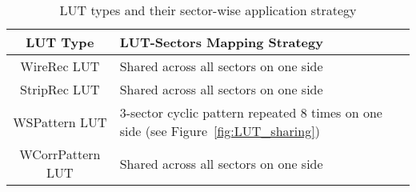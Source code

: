 \begin{table}[htbp]
  \centering
  \caption{LUT types and their sector-wise application strategy}
  \label{tab:LUT_with_sectors}
  \begin{tabular}{|c|p{8cm}|}
    \hline
    \textbf{LUT Type} & \textbf{LUT-Sectors Mapping Strategy} \\
    \hline
    WireRec LUT & Shared across all sectors on one side \\
    \hline
    StripRec LUT & Shared across all sectors on one side  \\
    \hline
    WSPattern LUT & 3-sector cyclic pattern repeated 8 times on one side (see Figure~\ref{fig:LUT_sharing}) \\
    \hline
    WCorrPattern LUT & Shared across all sectors on one side  \\
    \hline
  \end{tabular}
\end{table}